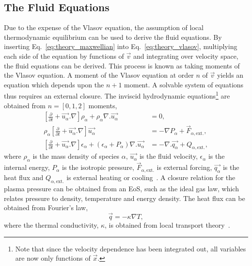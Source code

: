 \subsection{The Fluid Equations}%
\label{sec:theory_fluid}

Due to the expense of the Vlasov equation, the assumption of local thermodynamic equilibrium can be used to derive the fluid equations.
By inserting Eq.~\ref{eq:theory_maxwellian} into Eq.~\ref{eq:theory_vlasov}, multiplying each side of the equation by functions of $\vec{v}$ and integrating over velocity space, the fluid equations can be derived.
This process is known as taking moments of the Vlasov equation.
A moment of the Vlasov equation at order $n$ of $\vec{v}$ yields an equation which depends upon the $n+1$ moment.
A solvable system of equations thus requires an external closure.
The inviscid hydrodynamic equations\footnote{Note that since the velocity dependence has been integrated out, all variables are now only functions of $\vec{x}$.} are obtained from $n=[0,1,2]$ moments,
\begin{align}
    \label{eq:theory_fluid_eqs}
    \left [ \frac{\partial}{\partial t} + \vec{u_\alpha}.\nabla \right ] \rho_\alpha + \rho_\alpha\nabla . \vec{u_\alpha} &= 0,\\
    \rho_\alpha \left [ \frac{\partial}{\partial t} + \vec{u_\alpha}.\nabla \right ] \vec{u_\alpha} &= -\nabla P_\alpha + \vec{F}_{\alpha,\text{ext.}},\\
    \left [ \frac{\partial}{\partial t} + \vec{u_\alpha}.\nabla \right ] \epsilon_\alpha + (\epsilon_\alpha + P_\alpha)\nabla.\vec{u_\alpha} &= -\nabla . \vec{q_\alpha} + Q_{\alpha,\text{ext.}},
\end{align}
where $\rho_\alpha$ is the mass density of species $\alpha$, $\vec{u_\alpha}$ is the fluid velocity, $\epsilon_\alpha$ is the internal energy, $P_\alpha$ is the isotropic pressure, $\vec{F}_{\alpha,\text{ext.}}$ is external forcing, $\vec{q_\alpha}$ is the heat flux and $Q_{\alpha,\text{ext.}}$ is external heating or cooling~\cite{castor_radiation_2004}.
A closure relation for the plasma pressure can be obtained from an \ac{EoS}, such as the ideal gas law, which relates pressure to density, temperature and energy density.
The heat flux can be obtained from Fourier's law,
\begin{equation}
    \label{eq:theory_fourier_heat}
    \vec{q} = -\kappa \nabla T,
\end{equation}
where the thermal conductivity, $\kappa$, is obtained from local transport theory~\cite{braginskii_transport_1965,epperlein_plasma_1986}.

